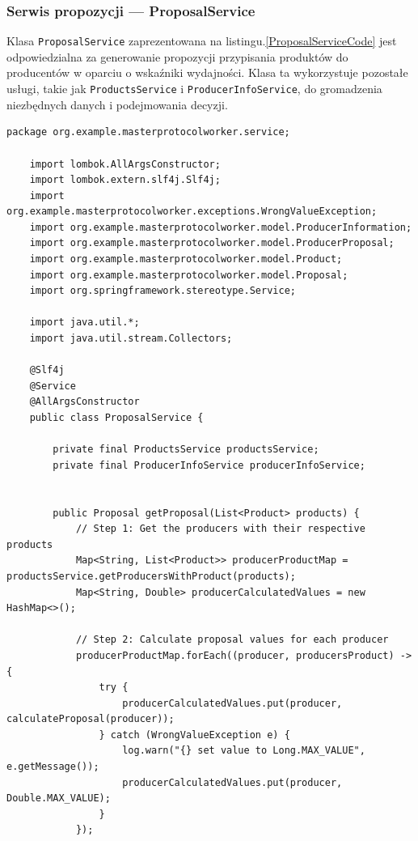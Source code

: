 \subsubsection{Serwis propozycji --- ProposalService}

Klasa \verb|ProposalService| zaprezentowana na listingu.\ref{ProposalServiceCode} jest odpowiedzialna za generowanie propozycji przypisania produktów do producentów w oparciu o wskaźniki wydajności. Klasa ta wykorzystuje pozostałe usługi, takie jak \verb|ProductsService| i \verb|ProducerInfoService|, do gromadzenia niezbędnych danych i podejmowania decyzji.

\begin{lstlisting}[caption=Kod klasy ProposalService, label=ProposalServiceCode]
    package org.example.masterprotocolworker.service;

    import lombok.AllArgsConstructor;
    import lombok.extern.slf4j.Slf4j;
    import org.example.masterprotocolworker.exceptions.WrongValueException;
    import org.example.masterprotocolworker.model.ProducerInformation;
    import org.example.masterprotocolworker.model.ProducerProposal;
    import org.example.masterprotocolworker.model.Product;
    import org.example.masterprotocolworker.model.Proposal;
    import org.springframework.stereotype.Service;
    
    import java.util.*;
    import java.util.stream.Collectors;
    
    @Slf4j
    @Service
    @AllArgsConstructor
    public class ProposalService {
    
        private final ProductsService productsService;
        private final ProducerInfoService producerInfoService;
    
    
        public Proposal getProposal(List<Product> products) {
            // Step 1: Get the producers with their respective products
            Map<String, List<Product>> producerProductMap = productsService.getProducersWithProduct(products);
            Map<String, Double> producerCalculatedValues = new HashMap<>();
    
            // Step 2: Calculate proposal values for each producer
            producerProductMap.forEach((producer, producersProduct) -> {
                try {
                    producerCalculatedValues.put(producer, calculateProposal(producer));
                } catch (WrongValueException e) {
                    log.warn("{} set value to Long.MAX_VALUE", e.getMessage());
                    producerCalculatedValues.put(producer, Double.MAX_VALUE);
                }
            });
    

\end{lstlisting}
